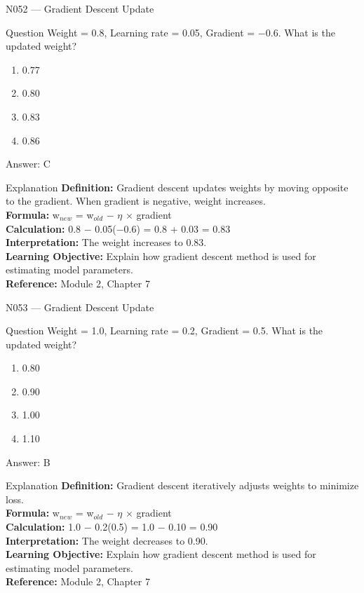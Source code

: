 \documentclass[aspectratio=169,8pt]{beamer}
\begin{document}
	\begin{frame}{N052 --- Gradient Descent Update}
		\begin{block}{Question}
			Weight = 0.8, Learning rate = 0.05, Gradient = $-$0.6. What is the updated weight?
			\begin{enumerate}
				\item 0.77
				\item 0.80
				\item 0.83
				\item 0.86
			\end{enumerate}
		\end{block}
		\begin{exampleblock}{Answer: C}\end{exampleblock}
		\begin{block}{Explanation}
			\textbf{Definition:} Gradient descent updates weights by moving opposite to the gradient. When gradient is negative, weight increases.\\
			\textbf{Formula:} w$_{new}$ = w$_{old}$ $-$ $\eta$ $\times$ gradient\\
			\textbf{Calculation:} 0.8 $-$ 0.05($-$0.6) = 0.8 + 0.03 = 0.83\\
			\textbf{Interpretation:} The weight increases to 0.83.\\
			\textbf{Learning Objective:} Explain how gradient descent method is used for estimating model parameters.\\
			\textbf{Reference:} Module 2, Chapter 7
		\end{block}
	\end{frame}
	
	\begin{frame}{N053 --- Gradient Descent Update}
		\begin{block}{Question}
			Weight = 1.0, Learning rate = 0.2, Gradient = 0.5. What is the updated weight?
			\begin{enumerate}
				\item 0.80
				\item 0.90
				\item 1.00
				\item 1.10
			\end{enumerate}
		\end{block}
		\begin{exampleblock}{Answer: B}\end{exampleblock}
		\begin{block}{Explanation}
			\textbf{Definition:} Gradient descent iteratively adjusts weights to minimize loss.\\
			\textbf{Formula:} w$_{new}$ = w$_{old}$ $-$ $\eta$ $\times$ gradient\\
			\textbf{Calculation:} 1.0 $-$ 0.2(0.5) = 1.0 $-$ 0.10 = 0.90\\
			\textbf{Interpretation:} The weight decreases to 0.90.\\
			\textbf{Learning Objective:} Explain how gradient descent method is used for estimating model parameters.\\
			\textbf{Reference:} Module 2, Chapter 7
		\end{block}
	\end{frame}
	
\end{document}
